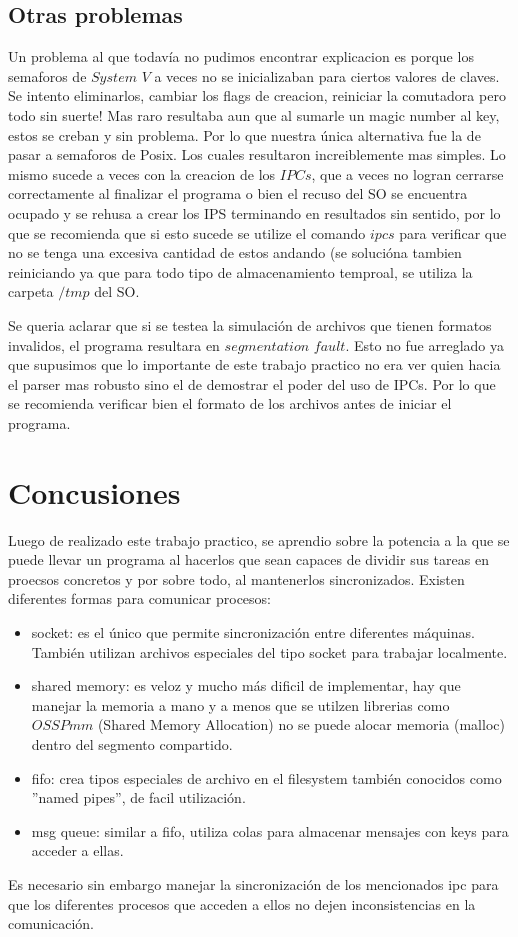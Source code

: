 \documentclass[a4paper,12pt,spanish]{article} %
\begin{document}
\subsection{Otras problemas}

Un problema al que todavía no pudimos encontrar explicacion es porque
los semaforos de $System$ $V$ a veces no se inicializaban para ciertos
valores de claves. Se intento eliminarlos, cambiar los flags de creacion,
reiniciar la comutadora pero todo sin suerte! Mas raro resultaba aun
que al sumarle un magic number al key, estos se creban y sin problema.
Por lo que nuestra única alternativa fue la de pasar a semaforos de
Posix. Los cuales resultaron increiblemente mas simples. Lo mismo
sucede a veces con la creacion de los $IPCs$, que a veces no logran
cerrarse correctamente al finalizar el programa o bien el recuso del
SO se encuentra ocupado y se rehusa a crear los IPS terminando en
resultados sin sentido, por lo que se recomienda que si esto sucede
se utilize el comando $ipcs$ para verificar que no se tenga una excesiva
cantidad de estos andando (se solucióna tambien reiniciando ya que
para todo tipo de almacenamiento temproal, se utiliza la carpeta $/tmp$
del SO.

Se queria aclarar que si se testea la simulación de archivos que tienen
formatos invalidos, el programa resultara en $segmentation$ $fault$.
Esto no fue arreglado ya que supusimos que lo importante de este trabajo
practico no era ver quien hacia el parser mas robusto sino el de demostrar
el poder del uso de IPCs. Por lo que se recomienda verificar bien
el formato de los archivos antes de iniciar el programa.

\pagebreak{}


\section{Concusiones}

Luego de realizado este trabajo practico, se aprendio sobre la potencia
a la que se puede llevar un programa al hacerlos que sean capaces
de dividir sus tareas en proecsos concretos y por sobre todo, al mantenerlos
sincronizados. 
Existen diferentes formas para comunicar procesos:
\begin{itemize}
 \item socket: es el único que permite sincronización entre diferentes máquinas. También
utilizan archivos especiales del tipo socket para trabajar localmente.
 \item shared memory: es veloz y mucho más dificil de implementar, hay que manejar la
memoria a mano y a menos que se utilzen librerias como $OSSP mm$ (Shared Memory Allocation)
no se puede alocar memoria (malloc) dentro del segmento compartido.
 \item fifo: crea tipos especiales de archivo en el filesystem también conocidos como
''named pipes'', de facil utilización.
 \item msg queue: similar a fifo, utiliza colas para almacenar mensajes con keys para
acceder a ellas.
\end{itemize}
Es necesario sin embargo manejar la sincronización de los mencionados ipc para que los
diferentes procesos que acceden a ellos no dejen inconsistencias en la comunicación.
\end{document}
